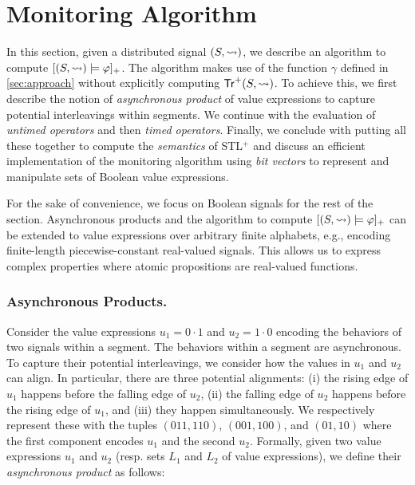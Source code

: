 \section{Monitoring Algorithm} 
\label{sec:algorithm}

In this section, given a distributed signal $(S,{\rightsquigarrow})$, we describe an algorithm to compute 
$[(S,{\rightsquigarrow}) \models \varphi]_+$.
The algorithm makes use of the function $\gamma$ defined in \cref{sec:approach} without explicitly computing $\mathsf{Tr}^+(S,{\rightsquigarrow})$.
To achieve this, we first describe the notion of \emph{asynchronous product} of value expressions to capture potential interleavings within segments.
We continue with the evaluation of \emph{untimed operators} and then \emph{timed operators}.
Finally, we conclude with putting all these together to compute the \emph{semantics} of STL$^+$ 
and discuss an efficient implementation of the monitoring algorithm using \emph{bit vectors} to 
represent and manipulate sets of Boolean value expressions.

\begin{remark}
	For the sake of convenience, we focus on Boolean signals for the rest of the section.
	Asynchronous products and the algorithm to compute $[(S,{\rightsquigarrow}) \models \varphi]_+$ can be extended to value expressions over arbitrary finite alphabets, e.g., encoding finite-length piecewise-constant real-valued signals.
	This allows us to express complex properties where atomic propositions are real-valued functions.
\end{remark}

\subsubsection{Asynchronous Products.}
Consider the value expressions $u_1 = 0 \cdot 1$ and $u_2 = 1 \cdot 0$ encoding the behaviors of two signals within a segment.
The behaviors within a segment are asynchronous.
To capture their potential interleavings, we consider how the values in $u_1$ and $u_2$ can align.
In particular, there are three potential alignments:
(i) the rising edge of $u_1$ happens before the falling edge of $u_2$,
(ii) the falling edge of $u_2$ happens before the rising edge of $u_1$, and
(iii) they happen simultaneously.
We respectively represent these with the tuples $(011, 110)$, $(001, 100)$, and $(01, 10)$ where the first component encodes $u_1$ and the second $u_2$.
Formally, given two value expressions $u_1$ and $u_2$ (resp.  sets $L_1$ and $L_2$ of value expressions), we define their \emph{asynchronous product} as follows:

